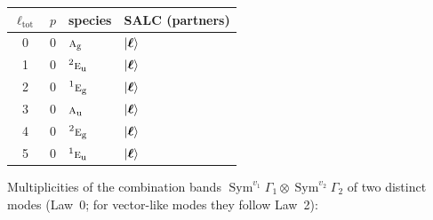 \documentclass[11pt]{article}
\newcommand{\irr}[1]{\text{\normalfont\scshape #1}}
\newcommand{\conjpair}[1]{{}^{#1}}
\newcommand{\ptag}[1]{\mathrm{#1}}
\begin{document}
\begin{longtable}{c c l l}\hline $\ell_{\mathrm{tot}}$ & $p$ & species & SALC (partners)\\ \hline\endhead

0 & 0 & $\irr{a}_{\ptag{g}}$ & $\ket{\boldsymbol\ell}$\\

1 & 0 & $\conjpair{2}\irr{e}_{\ptag{u}}$ & $\ket{\boldsymbol\ell}$\\

2 & 0 & $\conjpair{1}\irr{e}_{\ptag{g}}$ & $\ket{\boldsymbol\ell}$\\

3 & 0 & $\irr{a}_{\ptag{u}}$ & $\ket{\boldsymbol\ell}$\\

4 & 0 & $\conjpair{2}\irr{e}_{\ptag{g}}$ & $\ket{\boldsymbol\ell}$\\

5 & 0 & $\conjpair{1}\irr{e}_{\ptag{u}}$ & $\ket{\boldsymbol\ell}$\\

\hline\end{longtable}

Multiplicities of the combination bands $\operatorname{Sym}^{v_1}\Gamma_1\otimes\operatorname{Sym}^{v_2}\Gamma_2$ of two distinct modes (Law~0; for vector-like modes they follow Law~2):
\end{document}
